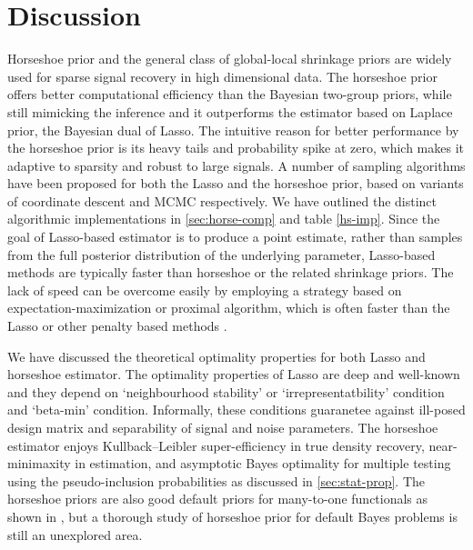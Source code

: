 \documentclass[11pt]{article}
\begin{document}


\section{Discussion}

Horseshoe prior and the general class of global-local shrinkage priors are widely used for sparse signal recovery in high dimensional data. The horseshoe prior offers better computational efficiency than the Bayesian two-group priors, while still mimicking the inference and it outperforms the estimator based on Laplace prior, the Bayesian dual of Lasso. The intuitive reason for better performance by the horseshoe prior is its heavy tails and probability spike at zero, which makes it adaptive to sparsity and robust to large signals. A number of sampling algorithms have been proposed for both the Lasso and the horseshoe prior, based on variants of coordinate descent and MCMC respectively. We have outlined the distinct algorithmic implementations in \ref{sec:horse-comp} and table \ref{hs-imp}. Since the goal of Lasso-based estimator is to produce a point estimate, rather than samples from the full posterior distribution of the underlying parameter, Lasso-based methods are typically faster than horseshoe or the related shrinkage priors. The lack of speed can be overcome easily by employing a strategy based on expectation-maximization or proximal algorithm, which is often faster than the Lasso or other penalty based methods \citep[vide]{bhadra2017horseshoe}. 

We have discussed the theoretical optimality properties for both Lasso and horseshoe estimator. The optimality properties of Lasso are deep and well-known and they depend on `neighbourhood stability' or `irrepresentatbility' condition and `beta-min' condition. Informally, these conditions guaranetee against ill-posed design matrix and 
separability of signal and noise parameters. The horseshoe estimator enjoys Kullback--Leibler super-efficiency in true density recovery, near-minimaxity in estimation, and asymptotic Bayes optimality for multiple testing using the pseudo-inclusion probabilities as discussed in \ref{sec:stat-prop}. The horseshoe priors are also good default priors for many-to-one functionals as shown in \citep{bhadra2016default}, but a thorough study of horseshoe prior for default Bayes problems is still an unexplored area. 
\end{document}
